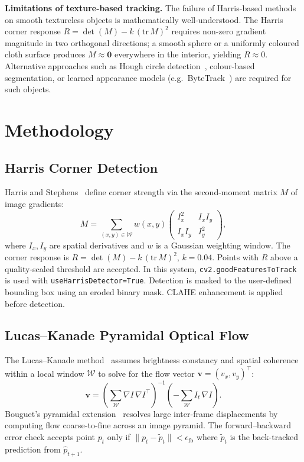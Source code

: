 \documentclass[12pt,a4paper]{article}
\begin{document}
\textbf{Limitations of texture-based tracking.}
The failure of Harris-based methods on smooth textureless objects is mathematically
well-understood. The Harris corner response $R = \det(M) - k\,(\mathrm{tr}\,M)^2$ requires
non-zero gradient magnitude in two orthogonal directions; a smooth sphere or a uniformly
coloured cloth surface produces $M \approx \mathbf{0}$ everywhere in the interior, yielding
$R \approx 0$. Alternative approaches such as Hough circle detection~\cite{hough},
colour-based segmentation, or learned appearance models (e.g.\ ByteTrack~\cite{bytetrack})
are required for such objects.

\section{Methodology}

\subsection{Harris Corner Detection}
Harris and Stephens~\cite{harris} define corner strength via the second-moment matrix $M$
of image gradients:
\[
  M = \sum_{(x,y)\in\mathcal{W}} w(x,y)
  \begin{pmatrix} I_x^2 & I_xI_y \\ I_xI_y & I_y^2 \end{pmatrix},
\]
where $I_x,I_y$ are spatial derivatives and $w$ is a Gaussian weighting window. The corner
response is $R = \det(M) - k\,(\mathrm{tr}\,M)^2$, $k=0.04$. Points with $R$ above a
quality-scaled threshold are accepted. In this system, \texttt{cv2.goodFeaturesToTrack}
is used with \texttt{useHarrisDetector=True}. Detection is masked to the user-defined
bounding box using an eroded binary mask. CLAHE enhancement is applied before detection.

\subsection{Lucas--Kanade Pyramidal Optical Flow}
The Lucas--Kanade method~\cite{lucas} assumes brightness constancy and spatial coherence
within a local window $\mathcal{W}$ to solve for the flow vector $\mathbf{v}=(v_x,v_y)^\top$:
\[
  \mathbf{v} = \left(\sum_{\mathcal{W}} \nabla I\, \nabla I^\top\right)^{-1}
               \left(-\sum_{\mathcal{W}} I_t\, \nabla I\right).
\]
Bouguet's pyramidal extension~\cite{bouguet} resolves large inter-frame displacements by
computing flow coarse-to-fine across an image pyramid. The forward--backward error check
accepts point $p_t$ only if $\|p_t - \tilde{p}_t\| < \epsilon_{\text{fb}}$ where $\tilde{p}_t$
is the back-tracked prediction from $\hat{p}_{t+1}$.
\end{document}
